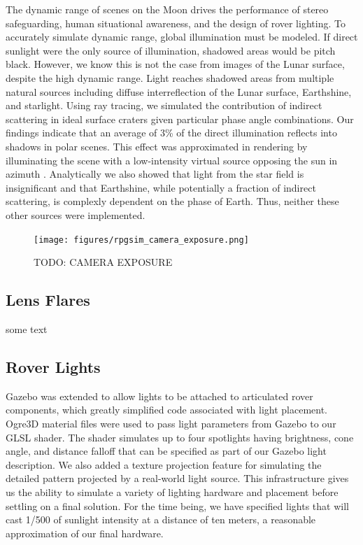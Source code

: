 \documentclass[twocolumn,letterpaper]{IEEEAerospaceCLS}  %
\begin{document}
The dynamic range of scenes on the Moon drives the performance of stereo safeguarding, human situational awareness, and the design of rover lighting. To accurately simulate dynamic range, global illumination must be modeled. If direct sunlight were the only source of illumination, shadowed areas would be pitch black. However, we know this is not the case from images of the Lunar surface, despite the high dynamic range. Light reaches shadowed areas from multiple natural sources including diffuse interreflection of the Lunar surface, Earthshine, and starlight. Using ray tracing, we simulated the contribution of indirect scattering in ideal surface craters given particular phase angle combinations. Our findings indicate that an average of 3\% of the direct illumination reflects into shadows in polar scenes. This effect was approximated in rendering by illuminating the scene with a low-intensity virtual source opposing the sun in azimuth . Analytically we also showed that light from the star field is insignificant and that Earthshine, while potentially a fraction of indirect scattering, is complexly dependent on the phase of Earth. Thus, neither these other sources were implemented.       

\begin{figure}[h!]
	\texttt{[image: figures/rpgsim\_camera\_exposure.png]}
   	\caption{TODO: CAMERA EXPOSURE}
    \label{fig:cameraexposure}
\end{figure}

\subsection{Lens Flares}
some text

\subsection{Rover Lights}
Gazebo was extended to allow lights to be attached to articulated rover components, which greatly simplified code associated with light placement. Ogre3D material files were used to pass light parameters from Gazebo to our GLSL shader. The shader simulates up to four spotlights having brightness, cone angle, and distance falloff that can be specified as part of our Gazebo light description. We also added a texture projection feature for simulating the detailed pattern projected by a real-world light source. This infrastructure gives us the ability to simulate a variety of lighting hardware and placement before settling on a final solution. For the time being, we have specified lights that will cast 1/500 of sunlight intensity at a distance of ten meters, a reasonable approximation of our final hardware.
\end{document}
